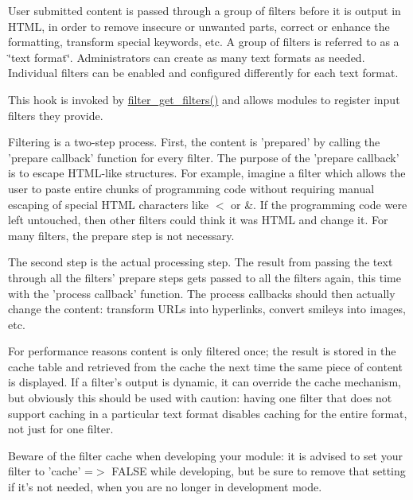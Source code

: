 User submitted content is passed through a group of filters before it is output in HTML, in order to remove insecure or unwanted parts, correct or enhance the formatting, transform special keywords, etc. A group of filters is referred to as a \char`\"{}text format\char`\"{}. Administrators can create as many text formats as needed. Individual filters can be enabled and configured differently for each text format.

This hook is invoked by \hyperlink{filter_8module_a9a4d34bbacb92f82ae844fefbd20d32d}{filter\_\-get\_\-filters()} and allows modules to register input filters they provide.

Filtering is a two-\/step process. First, the content is 'prepared' by calling the 'prepare callback' function for every filter. The purpose of the 'prepare callback' is to escape HTML-\/like structures. For example, imagine a filter which allows the user to paste entire chunks of programming code without requiring manual escaping of special HTML characters like $<$ or \&. If the programming code were left untouched, then other filters could think it was HTML and change it. For many filters, the prepare step is not necessary.

The second step is the actual processing step. The result from passing the text through all the filters' prepare steps gets passed to all the filters again, this time with the 'process callback' function. The process callbacks should then actually change the content: transform URLs into hyperlinks, convert smileys into images, etc.

For performance reasons content is only filtered once; the result is stored in the cache table and retrieved from the cache the next time the same piece of content is displayed. If a filter's output is dynamic, it can override the cache mechanism, but obviously this should be used with caution: having one filter that does not support caching in a particular text format disables caching for the entire format, not just for one filter.

Beware of the filter cache when developing your module: it is advised to set your filter to 'cache' =$>$ FALSE while developing, but be sure to remove that setting if it's not needed, when you are no longer in development mode.

